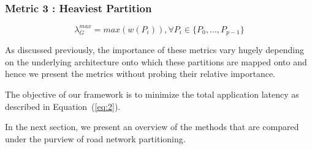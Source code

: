 \subsubsection{Metric 3 : Heaviest Partition}
\begin{equation}
\label{eq:metric3}
\lambda_G^{max} = max(w(P_i)), \forall P_i \in \{P_0,\dots,P_{p-1}\}
\end{equation}

As discussed previously, the importance of these metrics vary hugely depending on the underlying architecture onto which these partitions are mapped onto and hence we present the metrics without probing their relative importance.

The objective of our framework is to minimize the total application
latency as described in Equation~(\ref{eq:2}).

In the next section, we present an overview of the methods that are compared under the purview of road network partitioning.